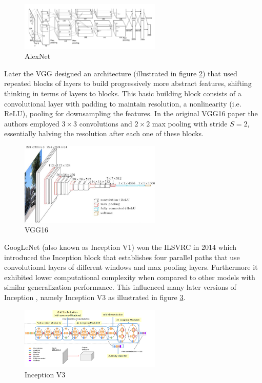 \begin{figure}[ht]
    \centering
    \includegraphics[width=0.6\textwidth]{figs/alexnet.png}
    \caption{AlexNet}
    \label{fig:alexnet}
\end{figure}

Later the \ac{VGG} designed an architecture (illustrated in figure \ref{fig:vgg16}) that used repeated blocks of layers to build progressively more abstract features, shifting thinking in terms of layers to blocks. This basic building block consists of a convolutional layer with padding to maintain resolution, a nonlinearity (i.e. ReLU), pooling for downsampling the features. In the original VGG16 paper \cite{vgg16} the authors employed $3 \times 3$ convolutions and $2 \times 2$ max pooling with stride $S = 2$, essentially halving the resolution after each one of these blocks.

\begin{figure}[ht]
    \centering
    \includegraphics[width=0.6\textwidth]{figs/vgg16.jpg}
    \caption{VGG16}
    \label{fig:vgg16}
\end{figure}

GoogLeNet \cite{inceptionv1} (also known as Inception V1) won the \ac{ILSVRC} \cite{imagenet} in 2014 which introduced the Inception block that establishes four parallel paths that use convolutional layers of different windows and max pooling layers. Furthermore it exhibited lower computational complexity when compared to other models with similar generalization performance. This influenced many later versions of Inception \cite{inceptionv2_3}\cite{inceptionv4}, namely Inception V3 as illustrated in figure \ref{fig:inceptionv3}.

\begin{figure}[ht]
    \centering
    \includegraphics[width=0.6\textwidth]{figs/inceptionv3.png}
    \caption{Inception V3}
    \label{fig:inceptionv3}
\end{figure}

